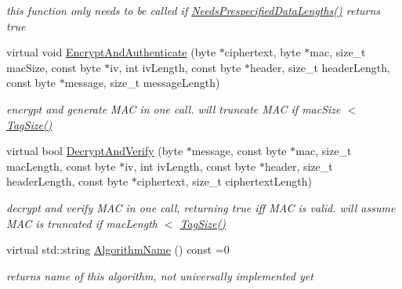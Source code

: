 \begin{DoxyCompactItemize}
\begin{DoxyCompactList}\small\item\em this function only needs to be called if \hyperlink{class_authenticated_symmetric_cipher_a52595d1c7b43c7a416da2fffba46330b}{NeedsPrespecifiedDataLengths()} returns true \item\end{DoxyCompactList}\item 
\hypertarget{class_authenticated_symmetric_cipher_a6078f8888fd8686c6de52091c63ae95d}{
virtual void \hyperlink{class_authenticated_symmetric_cipher_a6078f8888fd8686c6de52091c63ae95d}{EncryptAndAuthenticate} (byte $\ast$ciphertext, byte $\ast$mac, size\_\-t macSize, const byte $\ast$iv, int ivLength, const byte $\ast$header, size\_\-t headerLength, const byte $\ast$message, size\_\-t messageLength)}
\label{class_authenticated_symmetric_cipher_a6078f8888fd8686c6de52091c63ae95d}

\begin{DoxyCompactList}\small\item\em encrypt and generate MAC in one call. will truncate MAC if macSize $<$ \hyperlink{class_hash_transformation_a5e847d65a38ec354de1b28cc4bc66a81}{TagSize()} \item\end{DoxyCompactList}\item 
\hypertarget{class_authenticated_symmetric_cipher_ac600f86e6eeec53fff8e9d8681b5e614}{
virtual bool \hyperlink{class_authenticated_symmetric_cipher_ac600f86e6eeec53fff8e9d8681b5e614}{DecryptAndVerify} (byte $\ast$message, const byte $\ast$mac, size\_\-t macLength, const byte $\ast$iv, int ivLength, const byte $\ast$header, size\_\-t headerLength, const byte $\ast$ciphertext, size\_\-t ciphertextLength)}
\label{class_authenticated_symmetric_cipher_ac600f86e6eeec53fff8e9d8681b5e614}

\begin{DoxyCompactList}\small\item\em decrypt and verify MAC in one call, returning true iff MAC is valid. will assume MAC is truncated if macLength $<$ \hyperlink{class_hash_transformation_a5e847d65a38ec354de1b28cc4bc66a81}{TagSize()} \item\end{DoxyCompactList}\item 
\hypertarget{class_authenticated_symmetric_cipher_aae9cc715b7640cfc1f5fcad980ea34a2}{
virtual std::string \hyperlink{class_authenticated_symmetric_cipher_aae9cc715b7640cfc1f5fcad980ea34a2}{AlgorithmName} () const =0}
\label{class_authenticated_symmetric_cipher_aae9cc715b7640cfc1f5fcad980ea34a2}

\begin{DoxyCompactList}\small\item\em returns name of this algorithm, not universally implemented yet \item\end{DoxyCompactList}\end{DoxyCompactItemize}
